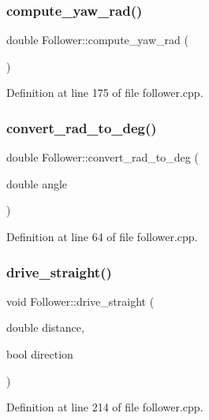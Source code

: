\subsubsection{\texorpdfstring{compute\+\_\+yaw\+\_\+rad()}{compute\_yaw\_rad()}}
{\footnotesize\ttfamily double Follower\+::compute\+\_\+yaw\+\_\+rad (\begin{DoxyParamCaption}{ }\end{DoxyParamCaption})}



Definition at line 175 of file follower.\+cpp.

\mbox{\label{class_follower_a670f07466502e1020514d6ba6b928553}} 
\subsubsection{\texorpdfstring{convert\+\_\+rad\+\_\+to\+\_\+deg()}{convert\_rad\_to\_deg()}}
{\footnotesize\ttfamily double Follower\+::convert\+\_\+rad\+\_\+to\+\_\+deg (\begin{DoxyParamCaption}\item[{double}]{angle }\end{DoxyParamCaption})}



Definition at line 64 of file follower.\+cpp.

\mbox{\label{class_follower_ad4d1ce6f43ce65c0aa5a560247ca55ad}} 
\subsubsection{\texorpdfstring{drive\+\_\+straight()}{drive\_straight()}}
{\footnotesize\ttfamily void Follower\+::drive\+\_\+straight (\begin{DoxyParamCaption}\item[{double}]{distance,  }\item[{bool}]{direction }\end{DoxyParamCaption})}



Definition at line 214 of file follower.\+cpp.

